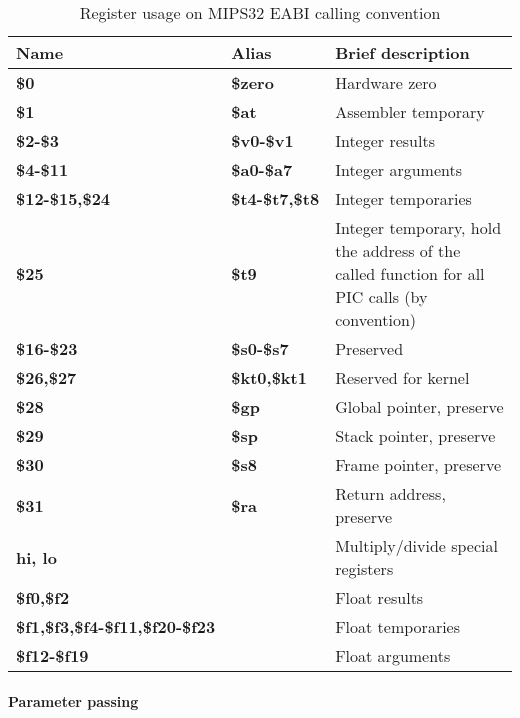 \begin{table}[h]
\begin{tabular*}{0.95\textwidth}{lll}
Name                                   & Alias                & Brief description\\
\hline
{\bf \$0}                              & {\bf \$zero}         & Hardware zero \\
{\bf \$1}                              & {\bf \$at}           & Assembler temporary \\
{\bf \$2-\$3}                          & {\bf \$v0-\$v1}      & Integer results \\
{\bf \$4-\$11}                         & {\bf \$a0-\$a7}      & Integer arguments\\
{\bf \$12-\$15,\$24}                   & {\bf \$t4-\$t7,\$t8} & Integer temporaries \\
{\bf \$25}                             & {\bf \$t9}           & Integer temporary, hold the address of the called function for all PIC calls (by convention) \\
{\bf \$16-\$23}                        & {\bf \$s0-\$s7}      & Preserved \\
{\bf \$26,\$27}                        & {\bf \$kt0,\$kt1}    & Reserved for kernel \\
{\bf \$28}                             & {\bf \$gp}           & Global pointer, preserve \\
{\bf \$29}                             & {\bf \$sp}           & Stack pointer, preserve \\
{\bf \$30}                             & {\bf \$s8}           & Frame pointer, preserve \\
{\bf \$31}                             & {\bf \$ra}           & Return address, preserve \\
{\bf hi, lo}                           &                      & Multiply/divide special registers \\
{\bf \$f0,\$f2}                        &                      & Float results \\
{\bf \$f1,\$f3,\$f4-\$f11,\$f20-\$f23} &                      & Float temporaries \\
{\bf \$f12-\$f19}                      &                      & Float arguments \\
\end{tabular*}
\caption{Register usage on MIPS32 EABI calling convention}
\end{table}

\paragraph{Parameter passing}

